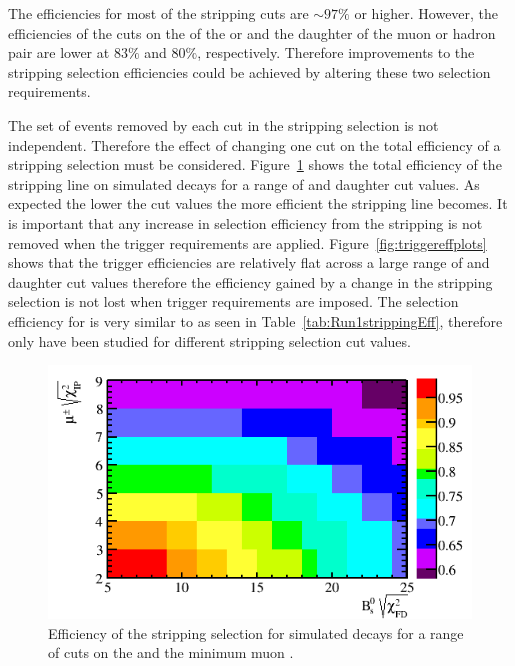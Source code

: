 The efficiencies for most of the stripping cuts are $\sim 97 \%$ or higher. However, the efficiencies of the cuts on the \chiFD of the \bsd or \jpsi and the daughter \chiIP of the muon or hadron pair are lower at $83 \%$ and $80 \%$, respectively. Therefore improvements to the stripping selection efficiencies could be achieved by altering these two selection requirements. 



The set of events removed by each cut in the stripping selection is not independent. Therefore the effect of changing one cut on the total efficiency of a stripping selection must be considered. Figure~\ref{fig:efficiencyplots} shows the total efficiency of the \bsmumu stripping line on simulated \bsmumu decays for a range of \chiFD and daughter \chiIP cut values. As expected the lower the cut values the more efficient the stripping line becomes. It is important that any increase in \bsmumu selection efficiency from the stripping is not removed when the trigger requirements are applied. Figure~\ref{fig:triggereffplots} shows that the trigger efficiencies are relatively flat across a large range of \chiFD and daughter \chiIP cut values therefore the efficiency gained by a change in the stripping selection is not lost when trigger requirements are imposed. The selection efficiency for \bdmumu is very similar to \bsmumu as seen in Table~\ref{tab:Run1strippingEff}, therefore only \bsmumu have been studied for different stripping selection cut values. 


\begin{figure}[tbp]
    \centering
        \includegraphics[width= 0.8 \textwidth]{./Figs/Selection/Bs2MuMu_efficiency_chart_Feb3.png}
    \caption{Efficiency of the \bmumu stripping selection for \bsmumu simulated decays for a range of cuts on the \bs \chiFD and the minimum muon \chiIP.}
    \label{fig:efficiencyplots}
\end{figure}

